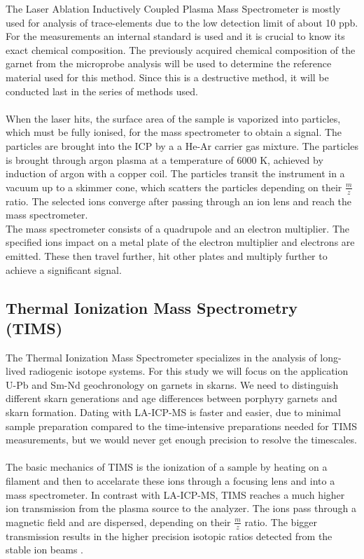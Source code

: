 \documentclass[a4paper,11pt,titlepage]{article}
\begin{document}
The Laser Ablation Inductively Coupled Plasma Mass Spectrometer is mostly used for analysis of trace-elements due to the low detection limit of about 10 ppb. For the measurements an internal standard is used and it is crucial to know its exact chemical composition. The previously acquired chemical composition of the garnet from the microprobe analysis will be used to determine the reference material used for this method. Since this is a destructive method, it will be conducted last in the series of methods used. 
\\
\\
\noindent When the laser hits, the surface area of the sample is vaporized into particles, which must be fully ionised, for the mass spectrometer to obtain a signal. The particles are brought into the ICP by a a He-Ar carrier gas mixture. The particles is brought through argon plasma at a temperature of 6000 K, achieved by induction of argon with a copper coil. The particles transit the instrument in a vacuum up to a skimmer cone, which scatters the particles depending on their \( \frac{m}{z} \) ratio. The selected ions converge after passing through an ion lens and reach the mass spectrometer.
\\
\noindent The mass spectrometer consists of a quadrupole and an electron multiplier. The specified ions impact on a metal plate of the electron multiplier and electrons are emitted. These then travel further, hit other plates and multiply further to achieve a significant signal. 


\subsection{Thermal Ionization Mass Spectrometry (TIMS)}

The Thermal Ionization Mass Spectrometer specializes in the analysis of long-lived radiogenic isotope systems. For this study we will focus on the application U-Pb and Sm-Nd geochronology on garnets in skarns. We need to distinguish different skarn generations and age differences between porphyry garnets and skarn formation. Dating with LA-ICP-MS is faster and easier, due to minimal sample preparation compared to the time-intensive preparations needed for TIMS measurements, but we would never get enough precision to resolve the timescales. 
\\
\\ The basic mechanics of TIMS is the ionization of a sample by heating on a filament and then to accelarate these ions through a focusing lens and into a mass spectrometer. In contrast with LA-ICP-MS, TIMS reaches a much higher ion transmission from the plasma source to the analyzer. The ions pass through a magnetic field and are dispersed, depending on their \( \frac{m}{z} \) ratio. The bigger transmission results in the higher precision isotopic ratios detected from the stable ion beams \citep{Schoene2017}. 
\end{document}
